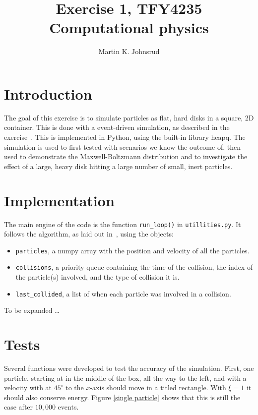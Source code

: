 \documentclass{article}
\title{Exercise 1, TFY4235 Computational physics}
\author{Martin K. Johnsrud}
\date{}
\begin{document}
    \maketitle
    \section*{Introduction}
        The goal of this exercise is to simulate particles as flat, hard disks in a square, 2D container. This is done with a event-driven simulation, as described in the exercise~\cite{exercise}. This is implemented in Python, using the built-in library heapq. The simulation is used to first tested with scenarios we know the outcome of, then used to demonstrate the Maxwell-Boltzmann distribution and to investigate the effect of a large, heavy disk hitting a large number of small, inert particles.
    
    \section*{Implementation}
        The main engine of the code is the function \verb|run_loop()| in \verb|utillities.py|. It follows the algorithm, as laid out in~\cite{exercise}, using the objects:
        \begin{itemize}
            \item \verb|particles|, a numpy array with the position and velocity of all the particles.
            \item \verb|collisions|, a priority queue containing the time of the collision, the index of the particle(s) involved, and the type of collision it is.
            \item \verb|last_collided|, a list of when each particle was involved in a collision.
        \end{itemize}
        To be expanded \dots

    \section*{Tests}
        Several functions were developed to test the accuracy of the simulation. First, one particle, starting at in the middle of the box, all the way to the left, and with a velocity with at $45^\circ$ to the $x$-axis should move in a titled rectangle. With $\xi=1$ it should also conserve energy. Figure \ref{single particle} shows that this is still the case after $10,000$ events. 
\end{document}
